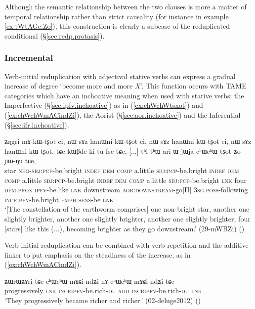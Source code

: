 Although the semantic relationship between the two clauses is more a matter of temporal relationship rather than strict causality (for instance in example \ref{ex:tWtAGe.Zo}), this construction is clearly a subcase of the reduplicated conditional (§\ref{sec:redp.protasis}).
 
\subsubsection{Incremental} \label{sec:redp.gradual.increase}
Verb-initial reduplication with adjectival stative verbs can express a gradual increase of degree `become more and more $X$'. This function occurs with TAME categories which have an inchoative meaning when used with stative verbs: the Imperfective (§\ref{sec:ipfv.inchoative}) as in (\ref{ex:chWchWtsxot}) and (\ref{ex:chWchWmACindZi}), the Aorist (§\ref{sec:aor.inchoative}) and the Inferential (§\ref{sec:ifr.inchoative}). 
 
\begin{exe}
\ex \label{ex:chWchWtsxot}
\gll ʑŋgri mɤ-kɯ-tʂot ci, nɯ sɤz hanɯni kɯ-tʂot ci, nɯ sɤz hanɯni kɯ-tʂot ci, nɯ sɤz hanɯni kɯ-tʂot,
tɕe kɯβde ki tu-fse tɕe, [...] tʰi tʰɯ-ari ɯ-jɯja cʰɯ\redp{}cʰɯ-tʂot ʑo ɲɯ-ŋu tɕe, \\
star \textsc{neg}-\textsc{sbj}:\textsc{pcp}-be.bright \textsc{indef} \textsc{dem} \textsc{comp} a.little \textsc{sbj}:\textsc{pcp}-be.bright \textsc{indef} \textsc{dem} \textsc{comp} a.little \textsc{sbj}:\textsc{pcp}-be.bright \textsc{indef} \textsc{dem} \textsc{comp} a.little \textsc{sbj}:\textsc{pcp}-be.bright  \textsc{lnk} four \textsc{dem}.\textsc{prox} \textsc{ipfv}-be.like \textsc{lnk} { } downstream \textsc{aor}:\textsc{downstream}-go[II] \textsc{3sg}.\textsc{poss}-following \textsc{incr}\redp{}\textsc{ipfv}-be.bright \textsc{emph} \textsc{sens}-be \textsc{lnk} \\
\glt `[The constellation of the earthworm comprises] one non-bright star, another one slightly brighter, another one slightly brighter, another one slightly brighter, four [stars] like this (...), becoming brighter as they go downstream.' (29-mWBZi)
()
\end{exe}

Verb-initial reduplication can be combined with verb repetition and the additive linker   to put emphasis on the steadiness of the increase, as in (\ref{ex:chWchWmACindZi}).

\begin{exe}
\ex \label{ex:chWchWmACindZi}
\gll   ʑɯrɯʑɤri tɕe cʰɯ\redp{}cʰɯ-mɤɕi-ndʑi nɤ cʰɯ\redp{}cʰɯ-mɤɕi-ndʑi tɕe \\
progressively \textsc{lnk} \textsc{incr}\redp{}\textsc{ipfv}-be.rich-\textsc{du} \textsc{add} \textsc{incr}\redp{}\textsc{ipfv}-be.rich-\textsc{du} \textsc{lnk} \\
\glt `They progressively became richer and richer.' (02-deluge2012) ()
\end{exe}


